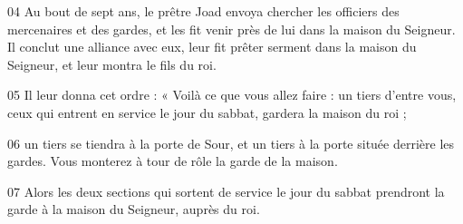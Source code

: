 
04 Au bout de sept ans, le prêtre Joad envoya chercher les officiers des mercenaires et des gardes, et les fit venir près de lui dans la maison du Seigneur. Il conclut une alliance avec eux, leur fit prêter serment dans la maison du Seigneur, et leur montra le fils du roi.

05 Il leur donna cet ordre : « Voilà ce que vous allez faire : un tiers d’entre vous, ceux qui entrent en service le jour du sabbat, gardera la maison du roi ;

06 un tiers se tiendra à la porte de Sour, et un tiers à la porte située derrière les gardes. Vous monterez à tour de rôle la garde de la maison.

07 Alors les deux sections qui sortent de service le jour du sabbat prendront la garde à la maison du Seigneur, auprès du roi.
